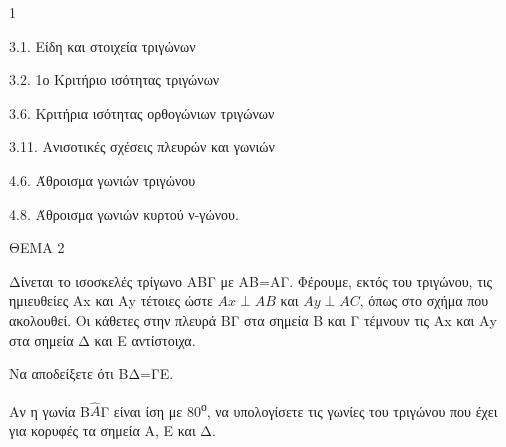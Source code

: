 \begin{ylh}{1}
    \item 3.1. Είδη και στοιχεία τριγώνων
    \item 3.2. 1ο Κριτήριο ισότητας τριγώνων
    \item 3.6. Κριτήρια ισότητας ορθογώνιων τριγώνων
    \item 3.11. Ανισοτικές σχέσεις πλευρών και γωνιών
    \item 4.6. Άθροισμα γωνιών τριγώνου
    \item 4.8. Άθροισμα γωνιών κυρτού ν-γώνου.
\end{ylh}

ΘΕΜΑ 2

Δίνεται το ισοσκελές τρίγωνο ΑΒΓ με ΑΒ=ΑΓ. Φέρουμε, εκτός του τριγώνου, τις ημιευθείες Αx και Αy τέτοιες ώστε $Ax \perp AB$ και $Ay \perp AC$, όπως στο σχήμα που ακολουθεί. Οι κάθετες στην πλευρά ΒΓ στα σημεία Β και Γ τέμνουν τις Αx και Αy στα σημεία Δ και Ε αντίστοιχα.

\begin{alist}
\item Να αποδείξετε ότι ΒΔ=ΓΕ. 

\item Αν η γωνία Β$\widehat{Α}$Γ είναι ίση με 80\textsuperscript{ο}, να υπολογίσετε τις γωνίες του τριγώνου που έχει για κορυφές τα σημεία Α, Ε και Δ. 


\begin{center}
\end{center}
\end{alist}
